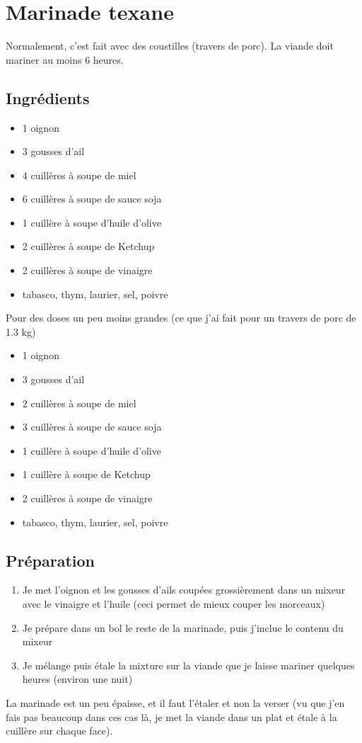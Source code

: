 \section{Marinade texane}
\begin{remarque}
Normalement, c'est fait avec des coustilles (travers de porc). La viande doit mariner au moins 6 heures.
\end{remarque}

\subsection*{Ingrédients}

\begin{itemize}
\item 1 oignon
\item 3 gousses d'ail
\item 4 cuillères à soupe de miel
\item 6 cuillères à soupe de sauce soja
\item 1 cuillère à soupe d'huile d'olive
\item 2 cuillères à soupe de Ketchup
\item 2 cuillères à soupe de vinaigre
\item tabasco, thym, laurier, sel, poivre
\end{itemize}

Pour des doses un peu moins grandes (ce que j'ai fait pour un travers de porc de 1.3 kg)
\begin{itemize}
\item 1 oignon
\item 3 gousses d'ail
\item 2 cuillères à soupe de miel
\item 3 cuillères à soupe de sauce soja
\item 1 cuillère à soupe d'huile d'olive
\item 1 cuillère à soupe de Ketchup
\item 2 cuillères à soupe de vinaigre
\item tabasco, thym, laurier, sel, poivre
\end{itemize}

\subsection*{Préparation}
\begin{enumerate}
\item Je met l'oignon et les gousses d'ails coupées grossièrement dans un mixeur avec le vinaigre et l'huile (ceci permet de mieux couper les morceaux)
\item Je prépare dans un bol le reste de la marinade, puis j'inclue le contenu du mixeur
\item Je mélange puis étale la mixture sur la viande que je laisse mariner quelques heures (environ une nuit)
\end{enumerate}

\begin{remarque}
La marinade est un peu épaisse, et il faut l'étaler et non la verser (vu que j'en fais pas beaucoup dans ces cas là, je met la viande dans un plat et étale à la cuillère sur chaque face).
\end{remarque}
